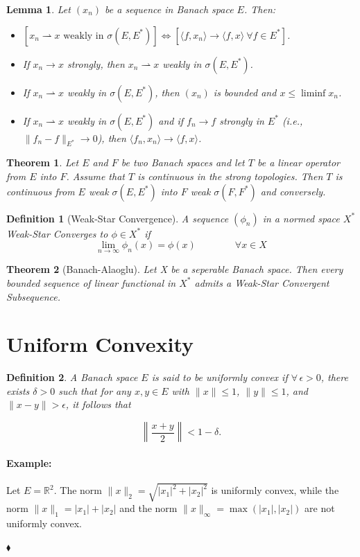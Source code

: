 \documentclass{article}
\newenvironment{example}{\paragraph{Example:}}{\hfill $\blacklozenge $}
\newtheorem{definition}{Definition}[section]
\newtheorem{theorem}{Theorem}[section]
\newtheorem{lemma}{Lemma}[section]
\begin{document}
\newpage
\begin{lemma}
Let $(x_n)$ be a sequence in Banach space $E$. Then:

\begin{itemize}
    \item[(i)] $[x_n \rightharpoonup x \text{ weakly in } \sigma(E, E^*)] \iff [\langle f, x_n \rangle \to \langle f, x \rangle \ \forall f \in E^*]$.
    
    \item[(ii)] If $x_n \to x$ strongly, then $x_n \rightharpoonup x$ weakly in $\sigma(E, E^*)$.
    
    \item[(iii)] If $x_n \rightharpoonup x$ weakly in $\sigma(E, E^*)$, then $(x_n)$ is bounded and $x \leq \liminf x_n$.
    
    \item[(iv)] If $x_n \rightharpoonup x$ weakly in $\sigma(E, E^*)$ and if $f_n \to f$ strongly in $E^*$ (i.e., $\|f_n - f\|_{E^*} \to 0$), then $\langle f_n, x_n \rangle \to \langle f, x \rangle$.
\end{itemize}

\end{lemma}
\begin{theorem}
 Let $E$ and $F$ be two Banach spaces and let $T$ be a linear operator from $E$ into $F$. Assume that $T$ is continuous in the strong topologies. Then $T$ is continuous from $E$ weak $\sigma(E, E^*)$ into $F$ weak $\sigma(F, F^*)$ and conversely.

\end{theorem}
\begin{definition}[Weak-Star Convergence]
    A sequence $(\phi_n)$ in a normed space $X^*$ Weak-Star Converges to $\phi \in X^*$ if \[ \lim_{n \to \infty} \phi_n (x) = \phi(x) \qquad \qquad \forall x \in X\]
\end{definition}
\begin{theorem}[Banach-Alaoglu]
    Let X be a seperable Banach space. Then every bounded sequence of linear functional in $X^*$ admits a Weak-Star Convergent Subsequence.
\end{theorem}
\section{Uniform Convexity }
\begin{definition}
 A Banach space $E$ is said to be uniformly convex if $\forall \, \epsilon > 0$, there exists $\delta > 0$ such that for any $x, y \in E$ with $\|x\| \leq 1$, $\|y\| \leq 1$, and $\|x - y\| > \epsilon$, it follows that

\[
\left\|\frac{x + y}{2}\right\| < 1 - \delta.
\]

\end{definition}
\begin{example}
 Let $E = \mathbb{R}^2$. The norm $\|x\|_2 = \sqrt{|x_1|^2 + |x_2|^2}$ is uniformly convex, while the norm $\|x\|_1 = |x_1| + |x_2|$ and the norm $\|x\|_\infty = \max(|x_1|, |x_2|)$ are not uniformly convex.

\end{example}
\end{document}
